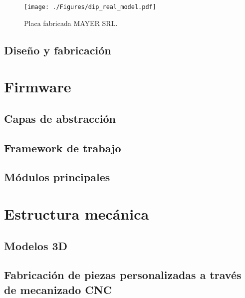 \begin{figure}[htbp]
	\centering
	\texttt{[image: ./Figures/dip\_real\_model.pdf]}
	\caption{Placa fabricada MAYER SRL.}
	\label{fig:dip_real_model}
\end{figure}

  
\subsection{Diseño y fabricación}



\section{Firmware}

\subsection{Capas de abstracción}
\subsection{Framework de trabajo}
\subsection{Módulos principales}




\section{Estructura mecánica}

\subsection{Modelos 3D}
\subsection{Fabricación de piezas personalizadas a través de mecanizado CNC}


